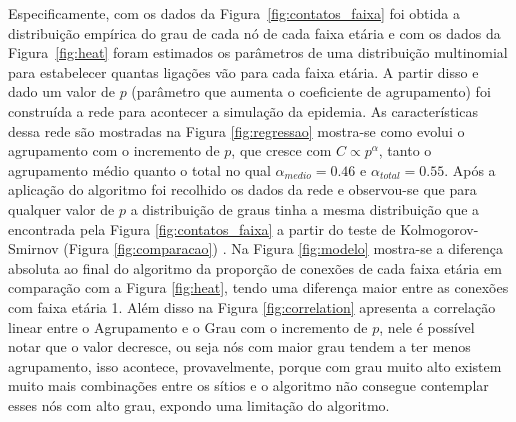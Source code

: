 Especificamente, com os dados da Figura~\ref{fig:contatos_faixa} foi obtida a distribuição empírica do grau de cada nó de cada faixa etária e com os dados da Figura~\ref{fig:heat} foram estimados os parâmetros de uma distribuição multinomial para estabelecer quantas ligações vão para cada faixa etária. A partir disso e dado um valor de $p$ (parâmetro que aumenta o coeficiente de agrupamento) foi construída a rede para acontecer a simulação da epidemia. As características dessa rede são mostradas na Figura \ref{fig:regressao}
mostra-se como evolui o agrupamento com o incremento de $p$, que cresce com $C \propto p^{\alpha}$, tanto o agrupamento médio quanto o total no qual $\alpha_{medio } = 0.46$ e $\alpha_{total } = 0.55$. Após a aplicação do algoritmo foi recolhido os dados da rede e observou-se que para qualquer valor de $p$ a distribuição de graus tinha a mesma distribuição que a encontrada pela Figura \ref{fig:contatos_faixa} a partir do teste de Kolmogorov-Smirnov (Figura \ref{fig:comparacao}) \cite{manual}. Na Figura \ref{fig:modelo}
mostra-se a diferença absoluta ao final do algoritmo da proporção de conexões de cada faixa etária em comparação com a Figura \ref{fig:heat}, tendo uma diferença maior entre as conexões com faixa etária 1. Além disso na Figura \ref{fig:correlation} apresenta a correlação linear entre o Agrupamento e o Grau com o incremento de $p$, nele é possível notar que o valor decresce, ou seja nós com maior grau tendem a ter menos agrupamento, isso acontece, provavelmente, porque com grau muito alto existem muito mais combinações entre os sítios e o algoritmo não consegue contemplar esses nós com alto grau, expondo uma limitação do algoritmo.
